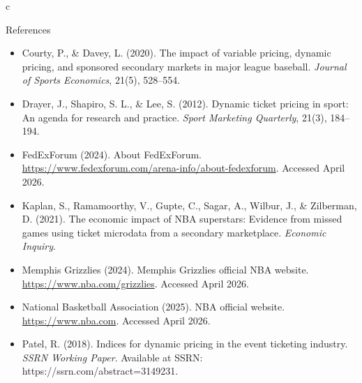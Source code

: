 \documentclass{beamer}
\begin{document}
c
\begin{frame}{References}
\tiny
\begin{itemize}
  \item Courty, P., \& Davey, L. (2020). The impact of variable pricing, dynamic pricing, and sponsored secondary markets in major league baseball. \textit{Journal of Sports Economics}, 21(5), 528--554.

  \item Drayer, J., Shapiro, S. L., \& Lee, S. (2012). Dynamic ticket pricing in sport: An agenda for research and practice. \textit{Sport Marketing Quarterly}, 21(3), 184--194.

  \item FedExForum (2024). About FedExForum. \url{https://www.fedexforum.com/arena-info/about-fedexforum}. Accessed April 2026.

  \item Kaplan, S., Ramamoorthy, V., Gupte, C., Sagar, A., Wilbur, J., \& Zilberman, D. (2021). The economic impact of NBA superstars: Evidence from missed games using ticket microdata from a secondary marketplace. \textit{Economic Inquiry}.

  \item Memphis Grizzlies (2024). Memphis Grizzlies official NBA website. \url{https://www.nba.com/grizzlies}. Accessed April 2026.

  \item National Basketball Association (2025). NBA official website. \url{https://www.nba.com}. Accessed April 2026.

  \item Patel, R. (2018). Indices for dynamic pricing in the event ticketing industry. \textit{SSRN Working Paper}. Available at SSRN: https://ssrn.com/abstract=3149231.
\end{itemize}
\end{frame}
\end{document}
